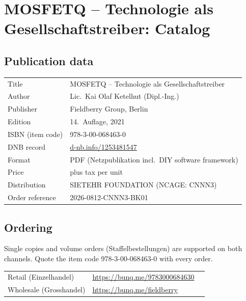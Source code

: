 \providecommand{\mqauthor}{Lic.\ Kai Olaf Ketelhut (Dipl.-Ing.)}
\providecommand{\mqisbn}{978-3-00-068463-0}
\providecommand{\mqorderref}{2026-0812-CNNN3-BK01}
\providecommand{\mqretail}{https://bunq.me/9783000684630}
\providecommand{\mqwholesale}{https://bunq.me/fieldberry}
\providecommand{\mqedition}{14.\ Auflage, 2021}

\chapter{MOSFETQ -- Technologie als Gesellschaftstreiber: Catalog}

\section{Publication data}
\begin{tabular}{@{}ll}
Title & MOSFETQ -- Technologie als Gesellschaftstreiber \\
Author & \mqauthor \\
Publisher & Fieldberry Group, Berlin \\
Edition & \mqedition \\
ISBN (item code) & \mqisbn \\
DNB record & \href{https://d-nb.info/1253481547}{d-nb.info/1253481547} \\
Format & PDF (Netzpublikation incl.\ DIY software framework) \\
Price & \texteuro 21.00 plus tax per unit \\
Distribution & SIETEHR FOUNDATION (NCAGE: CNNN3) \\
Order reference & \mqorderref \\
\end{tabular}

\section{Ordering}
Single copies and volume orders (Staffelbestellungen) are supported on both channels.
Quote the item code \mqisbn{} with every order.

\medskip
\noindent\begin{tabular}{@{}lll}
Retail (Einzelhandel) & \href{\mqretail}{\mqretail} \\
Wholesale (Grosshandel) & \href{\mqwholesale}{\mqwholesale} \\
\end{tabular}

